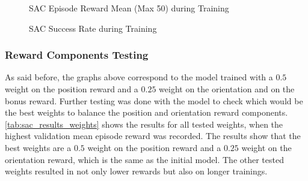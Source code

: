 \begin{figure}[H]%
    \centering
    {\fontsize{8}{11}\selectfont}
    \caption{SAC Episode Reward Mean (Max 50) during Training}
    \label{fig:reward}
\end{figure}

\begin{figure}[H]%
    \centering
    {\fontsize{8}{11}\selectfont}
    \caption{SAC Success Rate during Training}
    \label{fig:success_rate}
\end{figure}

\subsubsection{Reward Components Testing}

As said before, the graphs above correspond to the model trained with a $0.5$ weight on the position reward and a $0.25$ weight on the orientation and on the bonus reward. Further testing was done with the model to check which would be the best weights to balance the position and orientation reward components. \autoref{tab:sac_results_weights} shows the results for all tested weights, when the highest validation mean episode reward was recorded. The results show that the best weights are a $0.5$ weight on the position reward and a $0.25$ weight on the orientation reward, which is the same as the initial model. The other tested weights resulted in not only lower rewards but also on longer trainings.

